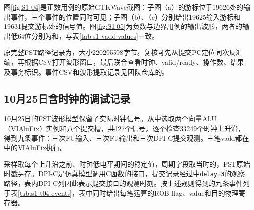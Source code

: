 图\ref{fig:S1-04}是正数用例的原始GTKWave截图：子图（a）的游标位于19626处的输出事件，三个事件的位置同时可见；子图（b）、（c）分别给出19625输入游标和19631提交游标处的信号值。图\ref{fig:S1-05}为负数与边界用例的输出波形，两者的输出低64位分别为和，与表\ref{tab:s1-vadd-values}一致。



原完整FST路径记录为，大小220295598字节。复核可先从提交PC定位同次反汇编，再根据CSV打开波形窗口，最后联合查看时钟、valid/ready、操作数、结果及事务标识。事件CSV和波形提取记录见团队仓库的。

\subsection{10月25日含时钟的调试记录}

10月25日的FST波形模型保留了实际时钟信号。从中选取两个向量ALU（VIAluFix）实例和八个提交槽，共127个信号，逐个检查33249个时钟上升沿，得到九条事件：三次FU输入、三次FU输出和三次DPI-C提交观测。三笔vadd都在中的VIAluFix执行。

采样取每个上升沿之前、时钟低电平期间的稳定值，周期字段取当时的，FST原始时戳另存。DPI-C是仿真模型调用C函数的接口，提交记录经过中\Verb|delay=3|的观察路径，表内DPI-C列因此表示提交接口的观测时刻。按上述规则得到的九条事件列于表\ref{tab:s1-t04-events}，表中同时给出每笔运算的ROB flag、value和目的物理寄存器。

